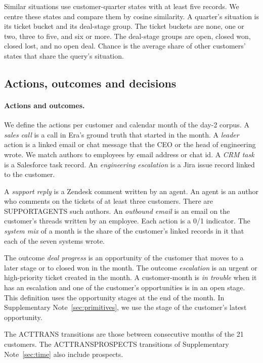 \documentclass[11pt]{article}
\begin{document}
Similar situations use customer-quarter states with at least five records. We centre these states and compare them by cosine similarity. A quarter's situation is its ticket bucket and its deal-stage group. The ticket buckets are none, one or two, three to five, and six or more. The deal-stage groups are open, closed won, closed lost, and no open deal. Chance is the average share of other customers' states that share the query's situation.

\subsection{Actions, outcomes and decisions}
\paragraph{Actions and outcomes.} We define the actions per customer and calendar month of the day-2 corpus. A \emph{sales call} is a call in Era's ground truth that started in the month. A \emph{leader} action is a linked email or chat message that the CEO or the head of engineering wrote. We match authors to employees by email address or chat id. A \emph{CRM task} is a Salesforce task record. An \emph{engineering escalation} is a Jira issue record linked to the customer.

A \emph{support reply} is a Zendesk comment written by an agent. An agent is an author who comments on the tickets of at least three customers. There are SUPPORTAGENTS such authors. An \emph{outbound email} is an email on the customer's threads written by an employee. Each action is a 0/1 indicator. The \emph{system mix} of a month is the share of the customer's linked records in it that each of the seven systems wrote.

The outcome \emph{deal progress} is an opportunity of the customer that moves to a later stage or to closed won in the month. The outcome \emph{escalation} is an urgent or high-priority ticket created in the month. A customer-month is \emph{in trouble} when it has an escalation and one of the customer's opportunities is in an open stage. This definition uses the opportunity stages at the end of the month. In Supplementary Note~\ref{sec:primitives}, we use the stage of the customer's latest opportunity.

The ACTTRANS transitions are those between consecutive months of the 21 customers. The ACTTRANSPROSPECTS transitions of Supplementary Note~\ref{sec:time} also include prospects.
\end{document}
